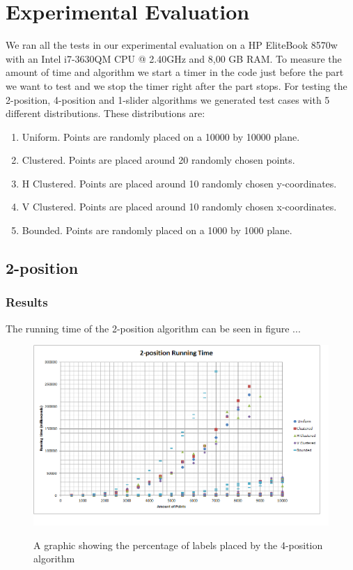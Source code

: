 \documentclass[crop=false,a4paper,oneside,11pt]{standalone}
\begin{document}
\section{Experimental Evaluation}

We ran all the tests in our experimental evaluation on a HP EliteBook 8570w with an Intel i7-3630QM CPU @ 2.40GHz and 8,00 GB RAM. To measure the amount of time and algorithm we start a timer in the code just before the part we want to test and we stop the timer right after the part stops. For testing the 2-position, 4-position and 1-slider algorithms we generated test cases with 5 different distributions. These distributions are:
\begin{enumerate}
    \item Uniform. Points are randomly placed on a 10000 by 10000 plane.
    \item Clustered. Points are placed around 20 randomly chosen points.
    \item H Clustered. Points are placed around 10 randomly chosen y-coordinates.
    \item V Clustered. Points are placed around 10 randomly chosen x-coordinates.
    \item Bounded. Points are randomly placed on a 1000 by 1000 plane.
\end{enumerate}

\subsection{2-position}
\subsubsection{Results}
The running time of the 2-position algorithm can be seen in figure ...
\begin{figure}[h!]
 \centering
  \includegraphics[scale = 0.5]{2PosRunningTime.png}\\
  \caption{A graphic showing the percentage of labels placed by the 4-position algorithm}
 \end{figure}
\end{document}
